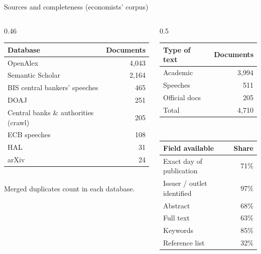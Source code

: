 \documentclass[aspectratio=169,10pt]{beamer}
\begin{document}
\begin{frame}{Sources and completeness (economists' corpus)}
\begin{columns}[T]
\begin{column}{0.46\textwidth}\footnotesize
\begin{tabular}{@{}lr@{}}\toprule
\textbf{Database} & \textbf{Documents}\\\midrule
OpenAlex & 4,043 \\
Semantic Scholar & 2,164 \\
BIS central bankers' speeches & 465 \\
DOAJ & 251 \\
Central banks \& authorities (crawl) & 205 \\
ECB speeches & 108 \\
HAL & 31 \\
arXiv & 24 \\
\bottomrule\end{tabular}\\[2pt]
\scriptsize Merged duplicates count in each database.
\end{column}
\begin{column}{0.5\textwidth}\footnotesize
\begin{tabular}{@{}lr@{}}\toprule
\textbf{Type of text} & \textbf{Documents}\\\midrule
Academic & 3,994 \\
Speeches & 511 \\
Official docs & 205 \\
\midrule Total & 4,710\\\bottomrule\end{tabular}\\[6pt]
\begin{tabular}{@{}lr@{}}\toprule
\textbf{Field available} & \textbf{Share}\\\midrule
Exact day of publication & 71\% \\
Issuer / outlet identified & 97\% \\
Abstract & 68\% \\
Full text & 63\% \\
Keywords & 85\% \\
Reference list & 32\% \\
\bottomrule\end{tabular}
\end{column}
\end{columns}
\end{frame}
\end{document}
